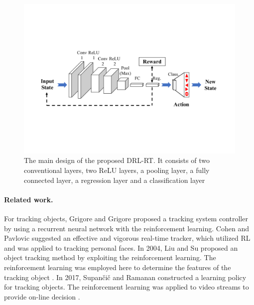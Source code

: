 \documentclass{svproc}
\begin{document}
\begin{figure}[!h]
	\centering
	\includegraphics[scale=.5,trim=2cm 5.5cm 2cm 5.5cm,clip]{Deep_Reinf_Net1.pdf}
	\caption{The main design of the proposed DRL-RT. It consists of two conventional layers, two ReLU layers, a pooling layer, a fully connected layer, a regression layer and a classification layer}
	\label{Fig:Deep_Reinf_Net}
\end{figure}

\paragraph{Related work.}  %
For tracking objects, Grigore and Grigore \cite{Grigore2000Reinforcement} proposed a tracking system controller by using a recurrent neural network with the reinforcement learning. %
Cohen and Pavlovic \cite{Cohen2010Reinforcement} suggested an effective and vigorous real-time tracker, which utilized RL and was applied to tracking personal faces. In 2004, Liu and Su proposed an object tracking method by exploiting the reinforcement learning. The reinforcement learning was employed here to determine the features of the tracking object \cite{Liu2004Reinforcement}. In 2017, Supan\v{c}i\v{c} and Ramanan constructed a learning policy for tracking objects. The reinforcement learning was applied to video streams to provide on-line decision \cite{Supancic2017Tracking}. 
	
\end{document}

